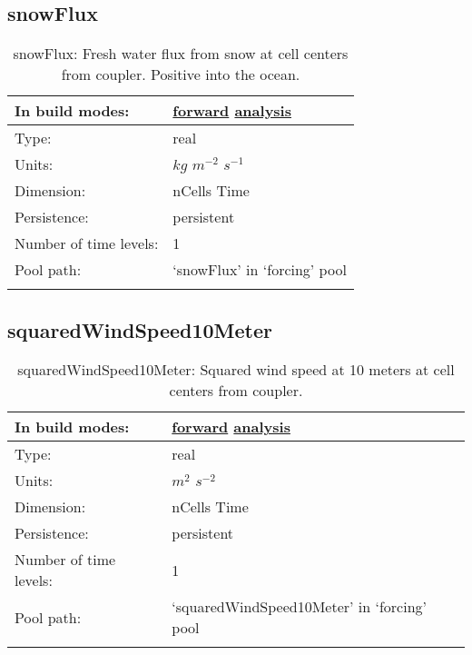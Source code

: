 \subsection[snowFlux]{snowFlux}
\label{subsec:var_sec_forcing_snowFlux}
\begin{center}
\begin{longtable}{| p{2.0in} | p{4.0in} |}
        \hline 
        In build modes: & \hyperref[subsec:forward_var_tab_forcing]{forward} \hyperref[subsec:analysis_var_tab_forcing]{analysis} \\
        \hline 
        Type: & real \\
        \hline 
        Units: & $kg$ $m^{-2}$ $s^{-1}$ \\
        \hline 
        Dimension: & nCells Time \\
        \hline 
        Persistence: & persistent \\
        \hline 
        Number of time levels: & 1 \\
        \hline 
            Pool path: & `snowFlux' in `forcing' pool \\
		 \hline 
    \caption{snowFlux: Fresh water flux from snow at cell centers from coupler. Positive into the ocean.}
\end{longtable}
\end{center}
\subsection[squaredWindSpeed10Meter]{squaredWindSpeed10Meter}
\label{subsec:var_sec_forcing_squaredWindSpeed10Meter}
\begin{center}
\begin{longtable}{| p{2.0in} | p{4.0in} |}
        \hline 
        In build modes: & \hyperref[subsec:forward_var_tab_forcing]{forward} \hyperref[subsec:analysis_var_tab_forcing]{analysis} \\
        \hline 
        Type: & real \\
        \hline 
        Units: & $m^2$ $s^{-2}$ \\
        \hline 
        Dimension: & nCells Time \\
        \hline 
        Persistence: & persistent \\
        \hline 
        Number of time levels: & 1 \\
        \hline 
            Pool path: & `squaredWindSpeed10Meter' in `forcing' pool \\
		 \hline 
    \caption{squaredWindSpeed10Meter: Squared wind speed at 10 meters at cell centers from coupler.}
\end{longtable}
\end{center}
